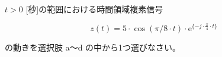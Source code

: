 $t > 0$ [秒]の範囲における時間領域複素信号 

\[
z(t) = 5 \cdot \cos(\pi/8 \cdot t ) \cdot \textrm{e}^{\{ -j \cdot \frac{\pi}{4} \cdot t \}}
\]

\medskip
\noindent の動きを選択肢 a〜d の中から1つ選びなさい。
